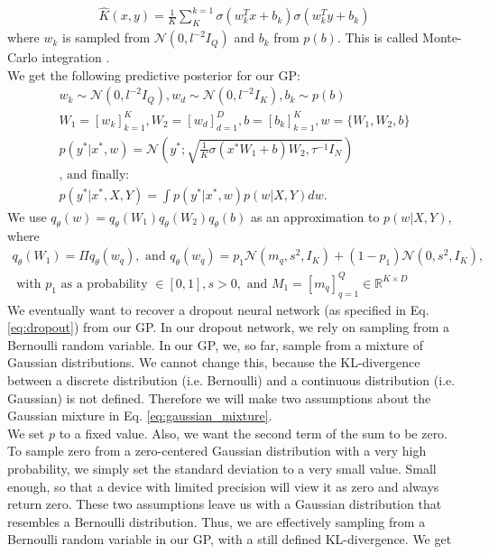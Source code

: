 \documentclass[a4paper,cleardoubleempty,BCOR1cm, 11pt]{report}
\begin{document}
\begin{align*}
	\hat{K}(x,y) = \frac{1}{K} \sum_{K}^{k=1} \sigma(w^T_k x + b_k)\sigma(w^T_k y + b_k)
\end{align*}
where $w_k$ is sampled from $\mathcal{N}(0, l^{-2}I_Q)$ and $b_k$ from $p(b)$. This is called Monte-Carlo integration \cite{metropolis1949monte}.\\
We get the following predictive posterior for our GP:
\begin{align*}
w_k \sim \mathcal{N}(0, l^{-2}I_Q), w_d \sim \mathcal{N}(0, l^{-2} I_K), b_k \sim p(b)\\
W_1 = \left[ w_k \right]^{K}_{k=1}, W_2 = \left[ w_d \right]^D_{d=1}, b = \left[ b_k \right]^K_{k=1}, w = \lbrace W_1, W_2, b \rbrace\\
p(y^*|x^*, w) = \mathcal{N} \left( y^*; \sqrt{\frac{1}{K}\sigma(x^* W_1 + b)W_2, \tau^{-1}I_N}\right)\\
\text{, and finally:}\hspace{150pt}\\
p(y^*|x^*, X,Y) = \int p(y^*|x^*, w)p(w|X,Y)dw.
\end{align*}
We use $q_{\theta}(w) = q_{\theta}(W_1)q_{\theta}(W_2)q_{\theta}(b)$ as an approximation to $p(w|X,Y)$, where
\begin{align}\label{eq:gaussian_mixture}
q_{\theta}(W_1) = \Pi q_{\theta}(w_q), \text{ and } q_{\theta}(w_q) = p_1\mathcal{N}(m_q, s^2, I_K) + (1-p_1) \mathcal{N}(0, s^2, I_K),\\
\text{ with } p_1 \text{ as a probability }\in \left[ 0, 1\right], s > 0, \text{ and }M_1 = \left[ m_q \right]^Q_{q=1} \in \mathbb{R}^{K\times D}
\end{align}
We eventually want to recover a dropout neural network (as specified in Eq. \ref{eq:dropout}) from our GP. In our dropout network, we rely on sampling from a Bernoulli random variable. In our GP, we, so far, sample from a mixture of Gaussian distributions. We cannot change this, because the KL-divergence between a discrete distribution (i.e. Bernoulli) and a continuous distribution (i.e. Gaussian) is not defined. Therefore we will make two assumptions about the Gaussian mixture in Eq. \ref{eq:gaussian_mixture}.\\
We set $p$ to a fixed value. Also, we want the second term of the sum to be zero. To sample zero from a zero-centered Gaussian distribution with a very high probability, we simply set the standard deviation to a very small value. Small enough, so that a device with limited precision will view it as zero and always return zero. These two assumptions leave us with a Gaussian distribution that resembles a Bernoulli distribution. Thus, we are effectively sampling from a Bernoulli random variable in our GP, with a still defined KL-divergence. We get
\end{document}
